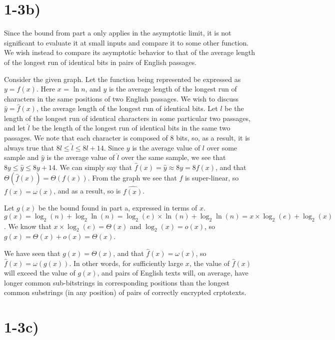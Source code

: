 \documentclass[11pt]{article}
\begin{document}
\newpage

\section*{1-3b)}

Since the bound from part a only applies in the asymptotic limit, it is not significant to evaluate it at small inputs and compare it to some other function. We wish instead to compare its asymptotic behavior to that of the average length of the longest run of identical bits in pairs of English passages.

Consider the given graph. Let the function being represented be expressed as $y = f(x)$. Here $x$ = $\ln n$, and $y$ is the average length of the longest run of characters in the same positions of two English passages. We wish to discuss $\hat{y} = \hat{f}(x)$, the average length of the longest run of identical bits. Let $l$ be the length of the longest run of identical characters in some particular two passages, and let $\hat{l}$ be the length of the longest run of identical bits in the same two passages. We note that each character is composed of $8$ bits, so, as a result, it is always true that $8l \le \hat{l} \le 8l + 14$. Since $y$ is the average value of $l$ over some sample and $\hat{y}$ is the average value of $\hat{l}$ over the same sample, we see that $8y \le \hat{y} \le 8y + 14$. We can simply say that $\hat{f}(x) = \hat{y} \approx 8y = 8f(x)$, and that $\Theta(\hat{f}(x)) = \Theta(f(x))$. From the graph we see that $f$ is super-linear, so $f(x) = \omega(x)$, and as a result, so is $\hat{f(x)}$.

Let $g(x)$ be the bound found in part a, expressed in terms of $x$. $g(x) = \log_2(n)+\log_2\ln(n) = \log_2(e)\times\ln(n)+\log_2\ln(n) = x\times\log_2(e) + \log_2(x)$. We know that $x\times\log_2(e) = \Theta(x)$ and $\log_2(x) = o(x)$, so $g(x) = \Theta(x) + o(x) = \Theta(x)$.

We have seen that $g(x) = \Theta(x)$, and that $\hat{f}(x) = \omega(x)$, so $\hat{f}(x) = \omega(g(x))$. In other words, for sufficiently large $x$, the value of $\hat{f}(x)$ will exceed the value of $g(x)$, and pairs of English texts will, on average, have longer common sub-bitstrings in corresponding positions than the longest common substrings (in any position) of pairs of correctly encrypted crptotexts. 

\newpage

\section*{1-3c)}
\end{document}
